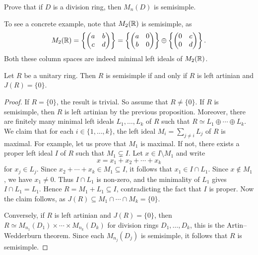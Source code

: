 
\begin{exercise}
\label{xca:M_n(D)_semisimple}
    Prove that if $D$ is a division ring, then 
    $M_n(D)$ is semisimple. 
\end{exercise}

To see a concrete example, note that  
$M_2(\mathbb{R})$ is semisimple, as  
\[
M_2(\mathbb{R})=\left\{\begin{pmatrix}
a&b\\
c&d
\end{pmatrix}\right\}
=
\left\{\begin{pmatrix}
a&0\\
b&0
\end{pmatrix}\right\}
\oplus
\left\{\begin{pmatrix}
0&c\\
0&d
\end{pmatrix}\right\}.
\]
Both these column spaces are indeed minimal left ideals of $M_2(\mathbb{R})$. 

\begin{theorem}
	\label{thm:SSartin=J}
	Let $R$ be a unitary ring. Then $R$ is semisimple if and only if 
	$R$ is left artinian and $J(R)=\{0\}$.
\end{theorem}

\begin{proof}
	If $R=\{0\}$, the result is trivial. So assume that $R\ne\{0\}$. 
    If $R$ is semisimple, then $R$ is left artinian by the previous proposition. 
    Moreover, 
    there are finitely many 
    minimal left ideals $L_1,\dots,L_k$ of $R$ 
    such that $R\simeq L_1\oplus\cdots\oplus L_k$. We claim that
    for each $i\in\{1,\dots,k\}$, the left ideal
    $M_i=\sum_{j\ne i}L_j$ of $R$ is maximal. For example, let us prove
    that $M_1$ is maximal. If not, there exists a proper left ideal $I$ of $R$ 
    such that $M_1\subsetneq I$. Let $x\in I\setminus M_1$ and write 
    \[
    x=x_1+x_2+\cdots+x_k
    \]
    for $x_j\in L_j$. Since $x_2+\cdots+x_k\in M_1\subseteq I$, 
    it follows that $x_1\in I\cap L_1$. Since $x\notin M_1$, we have $x_1\ne0$. Thus $I\cap L_1$
	is non-zero, and the minimality of $L_1$ gives $I\cap L_1=L_1$.
	Hence $R=M_1+L_1\subseteq I$, contradicting the fact that
	$I$ is proper.
	Now the claim follows, as
    $J(R)\subseteq M_1\cap\cdots\cap M_k=\{0\}$. 
    
    Conversely, if $R$ is left artinian and $J(R)=\{0\}$, then
    $R\simeq M_{n_1}(D_1)\times\cdots\times M_{n_k}(D_k)$ 
    for division rings $D_1,\dots,D_k$, this is the 
    Artin--Wedderburn theorem. 
    Since each $M_{n_j}(D_j)$ 
    is semisimple, it follows that $R$ is semisimple. 
\end{proof}

